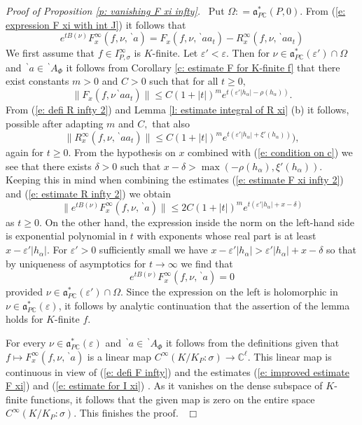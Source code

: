 \documentclass[12pt,a4paper]{article}
\def\qed{~\hfill\hbox{$\Box$}\medbreak}
\def\msy#1{{\mathbb #1}}
\def\C{{\msy C}}
\def\ga{\alpha}
\def\gd{\delta}
\def\ge{\varepsilon}
\def\gs{\sigma}
\def\got#1{\mathfrak #1}
\def\fa{{\got a}}
\def\to{\rightarrow}
\def\iC{{\scriptscriptstyle \C}}
\numberwithin{Thm}{section}
\numberwithin{equation}{section}
\def\faPdc{{\fa_{P\iC}^*}}
\numberwithin{equation}{section}
\def\bp{\!{\,}^\backprime}
\def\faPdc{\fa_{P\iC}^*}
\def\IPgs{I_{P,\gs}^\infty}
\def\xx{x}
\def\xxi{\xi}
\def\gsP{\gs}%
\begin{document}
{\em Proof of Proposition \ref{p: vanishing F xi infty}.\ }
Put $\Omega: = \faPdc(P,0).$ 
From (\ref{e: expression F xi with int J}) it follows that 
$$ 
e^{tB(\nu)} F^\infty_\xx(f, \nu, \bp a) = F_\xx(f,\nu, \bp aa_t)  -  R^\infty_\xx(f, \nu, \bp a a_t)
$$%
We first assume that $f\in \IPgs$ is $K$-finite. 
Let $\ge' <\ge.$ Then for 
$\nu \in \faPdc(\ge') \cap \Omega$ and $\bp a \in \bp A_\Phi$
it follows from Corollary \ref{c: estimate F for K-finite f} that there exist constants 
$m >0$ and $C > 0$ 
such that for all $t \geq 0,$ 
\begin{equation}
\label{e: estimate F xi infty 2}
\|F_\xx(f, \nu \bp a a_t)\|\leq C ( 1 + |t|)^m e^{t(\ge'|h_\ga| - \rho(h_\ga))}.
\end{equation}
From (\ref{e: defi R infty 2}) and Lemma \ref{l: estimate integral of R xi} (b)
it follows, possible after adapting $m$ and $C,$ that also 
\begin{equation}
\label{e: estimate R infty 2}
\|R^\infty_\xx(f, \nu, \bp a a_t)\| \leq C (1 + |t|)^m e^{t ( \ge'|h_\ga| + \xxi'(h_\ga))}),
\end{equation}
again for $t \geq 0.$ 
From the hypothesis on $\xx$ combined with (\ref{e: condition on c}) we see that there exists $\gd > 0$ such that
$\xx - \gd > \max(-\rho(h_\ga), \xxi'(h_\ga)).$ Keeping this in mind when combining 
the estimates (\ref{e: estimate F xi infty 2}) and (\ref{e: estimate R infty 2}) we obtain
\begin{equation}
\|e^{tB(\nu)} F^\infty_\xx(f, \nu, \bp a) \| \leq 2C(1 +|t|)^m e^{t(\ge' |h_\ga| + \xx - \gd)}
\end{equation}
as $t \geq 0.$ 
On the other hand, the expression inside the norm on the left-hand side is exponential polynomial in $t$  with exponents whose real part is at least $\xx - \ge'|h_\ga|.$ 
For $\ge'>0$ sufficiently small we have $\xx -\ge'|h_\ga| > \ge' |h_\ga| + \xx - \gd$ 
so that by uniqueness of asymptotics for $t \to \infty$ we find that 
$$ 
e^{tB(\nu)} F^\infty_\xx (f, \nu, \bp a)  = 0
$$%
provided $\nu \in \faPdc(\ge')\cap \Omega.$ 
Since the expression on the left is holomorphic in $\nu \in \faPdc(\ge)$, 
it follows by analytic continuation that the assertion of the lemma holds for $K$-finite $f.$ 

For every $\nu \in \faPdc(\ge)$ and $\bp a \in \bp A_\Phi$ it follows from the definitions given 
that $f \mapsto F^{\infty}_\xx(f, \nu, \bp a)$ is a  linear
map $C^\infty(K/K_P:\gsP) \to \C^\ell.$ This linear map is continuous in view of 
(\ref{e: defi F infty}) and 
the estimates (\ref{e: improved estimate F xi}) and (\ref{e: estimate for I xi}) .
As it vanishes on the dense subspace of $K$-finite functions, it follows
that the given map is zero on the entire space $C^\infty(K/K_P:\gsP).$ 
This finishes the proof.
\qed
\end{document}
